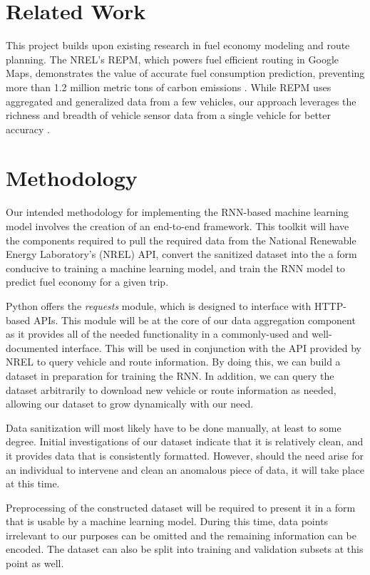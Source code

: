 \documentclass[letterpaper]{article}
\begin{document}
\section{Related Work}

This project builds upon existing research in fuel economy modeling and route planning. 
The NREL's REPM, which powers fuel efficient routing in Google Maps, 
demonstrates the value of accurate fuel consumption prediction, 
preventing more than 1.2 million metric tons of carbon emissions \cite{google_2023_environmental_report}.
While REPM uses aggregated and generalized data from a few vehicles, 
our approach leverages the richness and breadth of vehicle sensor data from a single vehicle for better accuracy \cite{nrel_routee}.


\section{Methodology} %
Our intended methodology for implementing the RNN-based machine learning model involves the creation of an end-to-end
framework. This toolkit will have the components required to pull the required data from the National Renewable
Energy Laboratory's (NREL) API, convert the sanitized dataset into the a form conducive to training a machine learning
model, and train the RNN model to predict fuel economy for a given trip.

Python offers the \emph{requests} module, which is designed to interface with HTTP-based APIs. This module will be at
the core of our data aggregation component as it provides all of the needed functionality in a commonly-used and
well-documented interface. This will be used in conjunction with the API provided by NREL to query vehicle and route
information. By doing this, we can build a dataset in preparation for training the RNN. In addition, we can query the
dataset arbitrarily to download new vehicle or route information as needed, allowing our dataset to grow dynamically
with our need.

Data sanitization will most likely have to be done manually, at least to some degree. Initial investigations of our
dataset indicate that it is relatively clean, and it provides data that is consistently formatted. However, should the
need arise for an individual to intervene and clean an anomalous piece of data, it will take place at this time.

Preprocessing of the constructed dataset will be required to present it in a form that is usable by a machine learning
model. During this time, data points irrelevant to our purposes can be omitted and the remaining information can be
encoded. The dataset can also be split into training and validation subsets at this point as well.
\end{document}
